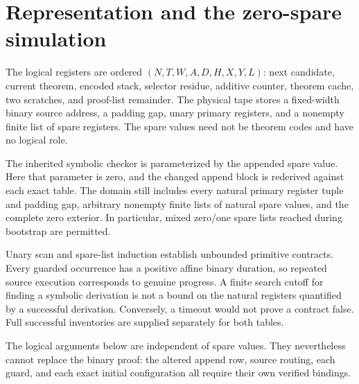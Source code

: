 \section{Representation and the zero-spare simulation}
The logical registers are ordered $(N,T,W,A,D,H,X,Y,L)$: next candidate, current theorem, encoded stack, selector residue, additive counter, theorem cache, two scratches, and proof-list remainder. The physical tape stores a fixed-width binary source address, a padding gap, unary primary registers, and a nonempty finite list of spare registers. The spare values need not be theorem codes and have no logical role.

The inherited symbolic checker is parameterized by the appended spare value. Here that parameter is zero, and the changed append block is rederived against each exact table. The domain still includes every natural primary register tuple and padding gap, arbitrary nonempty finite lists of natural spare values, and the complete zero exterior. In particular, mixed zero/one spare lists reached during bootstrap are permitted.

Unary scan and spare-list induction establish unbounded primitive contracts. Every guarded occurrence has a positive affine binary duration, so repeated source execution corresponds to genuine progress. A finite search cutoff for finding a symbolic derivation is not a bound on the natural registers quantified by a successful derivation. Conversely, a timeout would not prove a contract false. Full successful inventories are supplied separately for both tables.

The logical arguments below are independent of spare values. They nevertheless cannot replace the binary proof: the altered append row, source routing, each guard, and each exact initial configuration all require their own verified bindings.
